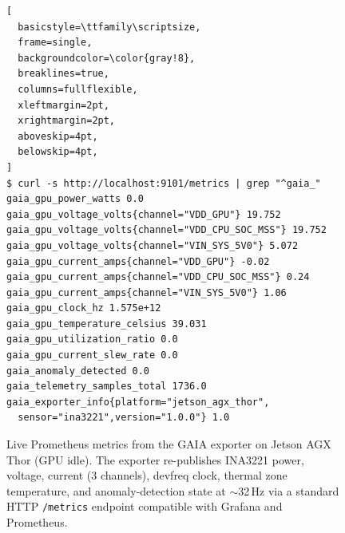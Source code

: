 \begin{figure}[t]
\begin{lstlisting}[
  basicstyle=\ttfamily\scriptsize,
  frame=single,
  backgroundcolor=\color{gray!8},
  breaklines=true,
  columns=fullflexible,
  xleftmargin=2pt,
  xrightmargin=2pt,
  aboveskip=4pt,
  belowskip=4pt,
]
$ curl -s http://localhost:9101/metrics | grep "^gaia_"
gaia_gpu_power_watts 0.0
gaia_gpu_voltage_volts{channel="VDD_GPU"} 19.752
gaia_gpu_voltage_volts{channel="VDD_CPU_SOC_MSS"} 19.752
gaia_gpu_voltage_volts{channel="VIN_SYS_5V0"} 5.072
gaia_gpu_current_amps{channel="VDD_GPU"} -0.02
gaia_gpu_current_amps{channel="VDD_CPU_SOC_MSS"} 0.24
gaia_gpu_current_amps{channel="VIN_SYS_5V0"} 1.06
gaia_gpu_clock_hz 1.575e+12
gaia_gpu_temperature_celsius 39.031
gaia_gpu_utilization_ratio 0.0
gaia_gpu_current_slew_rate 0.0
gaia_anomaly_detected 0.0
gaia_telemetry_samples_total 1736.0
gaia_exporter_info{platform="jetson_agx_thor",
  sensor="ina3221",version="1.0.0"} 1.0
\end{lstlisting}
\caption{Live Prometheus metrics from the GAIA exporter on Jetson
  AGX Thor (GPU idle).  The exporter re-publishes INA3221 power,
  voltage, current (3 channels), devfreq clock, thermal zone
  temperature, and anomaly-detection state at $\sim$32\,Hz via
  a standard HTTP \texttt{/metrics} endpoint compatible with
  Grafana and Prometheus.}
\label{fig:prometheus}
\end{figure}
